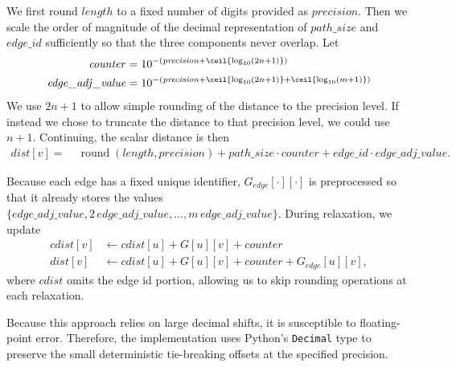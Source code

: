 \documentclass[ijoc,blindrev]{informs3} %
\begin{document}
We first round $\mathit{length}$ to a fixed number of digits provided as $\mathit{precision}$. Then we {\color{blue}scale the order of magnitude of} the decimal representation of $\mathit{path\_size}$ and $\mathit{edge\_id}$ sufficiently so that the three components never overlap. Let
\begin{equation*}
\begin{split}
\mathit{counter} &= 10^{-(\mathit{precision} + \ceil{\log_{10}(2n + 1)})} \\
\mathit{edge\_adj\_value} &= 10^{-(\mathit{precision} + \ceil{\log_{10}(2n + 1)} + \ceil{\log_{10}(m + 1)})}
\end{split}
\end{equation*}
We use $2n+1$ to allow simple rounding of the distance to the precision level. If instead we chose to truncate the distance to that precision level, we could use $n+1$. Continuing, the scalar distance is then
\begin{equation*}
\begin{split}
\mathit{dist}[v] =\;& \operatorname{round}(\mathit{length}, \mathit{precision}) + \mathit{path\_size} \cdot \mathit{counter} + \mathit{edge\_id} \cdot \mathit{edge\_adj\_value}.
\end{split}
\end{equation*}

Because each edge has a fixed unique identifier, $G_{\mathit{edge}}[\cdot][\cdot]$ is preprocessed so that it already stores the values $\{\mathit{edge\_adj\_value}, 2\,\mathit{edge\_adj\_value}, \dots, m\,\mathit{edge\_adj\_value}\}$. During relaxation, we update
\begin{equation*}
\begin{split}
\mathit{cdist}[v] &\leftarrow \mathit{cdist}[u] + G[u][v] + \mathit{counter} \\
\mathit{dist}[v] &\leftarrow \mathit{cdist}[u] + G[u][v] + \mathit{counter} + G_{\mathit{edge}}[u][v],
\end{split}
\end{equation*}
where $\mathit{cdist}$ omits the edge id portion, allowing us to skip rounding operations at each relaxation.

Because this approach relies on large decimal shifts, it is susceptible to floating-point error. Therefore, the implementation uses Python's \texttt{Decimal} type to preserve the small deterministic tie-breaking offsets at the specified precision.
\end{document}
